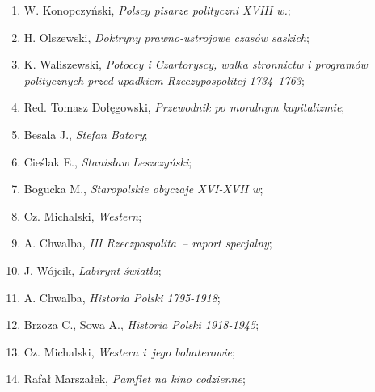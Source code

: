 \documentclass[a4paper,11pt]{article}
\begin{document}
\begin{enumerate}
\item W. Konopczyński, \textit{Polscy pisarze polityczni XVIII w.};



\item H. Olszewski, \textit{Doktryny prawno-ustrojowe czasów saskich};



\item K. Waliszewski, \textit{Potoccy i Czartoryscy, walka stronnictw i
    programów politycznych przed upadkiem Rzeczypospolitej 1734--1763};



\item Red. Tomasz Dołęgowski, \textit{Przewodnik po moralnym
    kapitalizmie};



\item Besala J., \textit{Stefan Batory};



\item Cieślak E., \textit{Stanisław Leszczyński};



\item Bogucka M., \textit{Staropolskie obyczaje XVI-XVII w};



\item Cz. Michalski, \textit{Western};



\item A. Chwalba, \textit{III Rzeczpospolita~-- raport specjalny};



\item J. Wójcik, \textit{Labirynt światła};



\item A. Chwalba, \textit{Historia Polski 1795-1918};



\item Brzoza C., Sowa A., \textit{Historia Polski 1918-1945};



\item Cz. Michalski, \textit{Western i~jego bohaterowie};



\item Rafał Marszałek, \textit{Pamflet na kino codzienne};




\end{enumerate}
\end{document}
